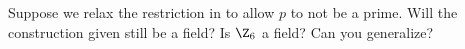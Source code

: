 Suppose we relax the restriction in  to allow $p$ to not be a prime.  Will the construction given still be a field?  Is $\Z_{6}$ a field?  Can you generalize?